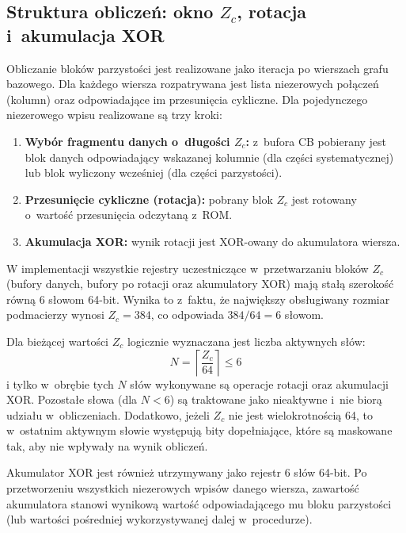 
\subsection{Struktura obliczeń: okno $Z_c$, rotacja i~akumulacja XOR}
\label{subsec:ldpc_enc_window_rotate_xor}

Obliczanie bloków parzystości jest realizowane jako iteracja po wierszach grafu bazowego. Dla każdego wiersza rozpatrywana jest lista niezerowych połączeń (kolumn) oraz odpowiadające im przesunięcia cykliczne. Dla pojedynczego niezerowego wpisu realizowane są trzy kroki:
\begin{enumerate}
    \item \textbf{Wybór fragmentu danych o~długości $Z_c$:} z~bufora CB pobierany jest blok danych odpowiadający wskazanej kolumnie (dla części systematycznej) lub blok wyliczony wcześniej (dla części parzystości).
    \item \textbf{Przesunięcie cykliczne (rotacja):} pobrany blok $Z_c$ jest rotowany o~wartość przesunięcia odczytaną z~ROM.
    \item \textbf{Akumulacja XOR:} wynik rotacji jest XOR-owany do akumulatora wiersza.
\end{enumerate}

W implementacji wszystkie rejestry uczestniczące w~przetwarzaniu bloków $Z_c$ (bufory danych, bufory po rotacji oraz akumulatory XOR) mają stałą szerokość równą 6 słowom 64-bit. Wynika to z~faktu, że największy obsługiwany rozmiar podmacierzy wynosi $Z_c=384$, co odpowiada $384/64 = 6$ słowom.

Dla bieżącej wartości $Z_c$ logicznie wyznaczana jest liczba aktywnych słów:
\[
N = \left\lceil \frac{Z_c}{64} \right\rceil \le 6
\]
i tylko w~obrębie tych $N$ słów wykonywane są operacje rotacji oraz akumulacji XOR. Pozostałe słowa (dla $N<6$) są traktowane jako nieaktywne i~nie biorą udziału w~obliczeniach.
Dodatkowo, jeżeli $Z_c$ nie jest wielokrotnością 64, to w~ostatnim aktywnym słowie występują bity dopełniające, które są maskowane tak, aby nie wpływały na wynik obliczeń.


Akumulator XOR jest również utrzymywany jako rejestr $6$ słów 64-bit. Po przetworzeniu wszystkich niezerowych wpisów danego wiersza, zawartość akumulatora stanowi wynikową wartość odpowiadającego mu bloku parzystości (lub wartości pośredniej wykorzystywanej dalej w~procedurze).


